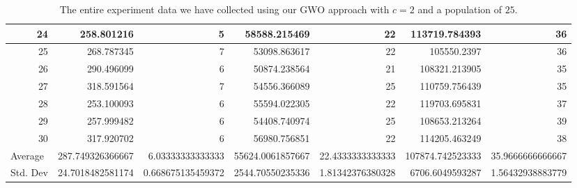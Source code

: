 \begin{table}
\begin{adjustwidth}{}{}
{{\begin{tabular}{|r|r|r|r|r|r|r|}
\hline
24                                         & 258.801216                   & 5                                     & 58588.215469                   & 22                                    & 113719.784393                & 36                                     \\ 
\hline
25                                         & 268.787345                   & 7                                     & 53098.863617                   & 22                                    & 105550.2397                  & 36                                     \\ 
\hline
26                                         & 290.496099                   & 6                                     & 50874.238564                   & 21                                    & 108321.213905                & 35                                     \\ 
\hline
27                                         & 318.591564                   & 7                                     & 54556.366089                   & 25                                    & 110759.756439                & 35                                     \\ 
\hline
28                                         & 253.100093                   & 6                                     & 55594.022305                   & 22                                    & 119703.695831                & 37                                     \\ 
\hline
29                                         & 257.999482                   & 6                                     & 54408.740974                   & 25                                    & 108653.213264                & 39                                     \\ 
\hline
30                                         & 317.920702                   & 6                                     & 56980.756851                   & 22                                    & 114205.463249                & 38                                     \\ 
\hline
\multicolumn{1}{|l|}{Average}              & 287.749326366667             & 6.03333333333333                      & 55624.0061857667               & 22.4333333333333                      & 107874.742523333             & 35.9666666666667                       \\ 
\hline
\multicolumn{1}{|l|}{Std. Dev}             & 24.7018482581174             & 0.668675135459372                     & 2544.70550235336               & 1.81342376380328                      & 6706.6049593287              & 1.56432938883779                       \\
\hline
\end{tabular}}}
\end{adjustwidth}
\caption{The entire experiment data we have collected using our GWO approach with $c = 2$ and a population of $25$.}
\label{full-data-gwo-c2-p25}
\end{table}

